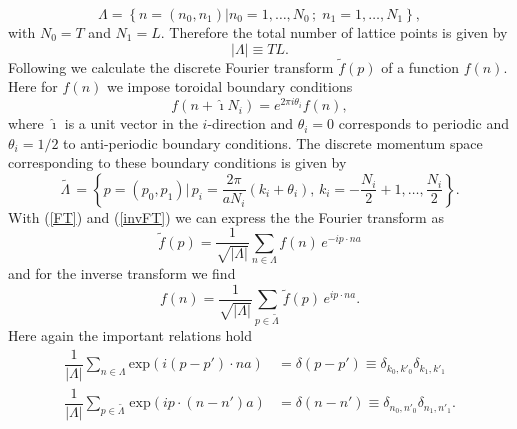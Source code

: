 \begin{equation}
\mathit{\Lambda}=\left\lbrace  n=\left(n_{0},n_{1}\right) \vert n_{0}=1,\ldots,N_{0}\,; \; n_{1}=1,\ldots,N_{1} \right\rbrace,
\end{equation}
with $N_{0}=T$ and $N_{1}=L$. Therefore the total number of lattice points is given by
\begin{equation}
\vert \mathit{\Lambda}\vert \equiv TL.
\end{equation}
Following \cite{gattringer2009quantum} we calculate the discrete Fourier transform $\tilde{f}(p)$ of a function $f(n)$. Here for $f(n)$ we impose toroidal boundary conditions
\begin{equation}
f(n+\hat{\imath}N_{i})= e ^{2\pi i \theta_{i}}f(n),
\label{eq: boundary_cond}
\end{equation}
where $\hat{\imath}$ is a unit vector in the $i$-direction and $\theta_{i}=0$ corresponds to periodic and $\theta_{i}=1/2$ to anti-periodic boundary conditions. The discrete momentum space corresponding to these boundary conditions is given by
\begin{equation}
\mathit{\widetilde{\Lambda\,}}= \left\lbrace p=(p_{0},p_{1}) \vert\, p_{i}=\dfrac{2\pi}{aN_{i}}(k_{i}+\theta_{i}) ,\, k_{i}=-\dfrac{N_{i}}{2}+1,\ldots,\dfrac{N_{i}}{2} \right\rbrace.
\end{equation}
With (\ref{FT}) and (\ref{invFT}) we can express the the Fourier transform as
\begin{equation}
\tilde{f}(p)=\dfrac{1}{\sqrt{\vert\mathit{\Lambda}\vert}} \sum\limits_{n\in \mathit{\Lambda}} f(n)\,  e ^{- i  p\cdot na}
\end{equation}
and for the inverse transform we find
\begin{equation}
f(n) = \dfrac{1}{\sqrt{\vert\mathit{\Lambda}\vert}} \sum\limits_{p\in \widetilde{\mathit{\Lambda}\,}} \tilde{f}(p)\,  e ^{ i p\cdot na}.
\end{equation}
Here again the important relations hold
\begin{align}
\dfrac{1}{\vert\mathit{\Lambda}\vert} \sum\limits_{n\in \mathit{\Lambda}} \text{exp}( i (p-p')\cdot na) &=\delta(p-p') \equiv \delta_{k_{0},k'_{0}}\delta_{k_{1},k'_{1}} \\
\dfrac{1}{\vert\mathit{\Lambda}\vert} \sum\limits_{p\in  \widetilde{\mathit{\Lambda}\,}} \text{exp}( i p\cdot (n-n')a) &=\delta(n-n') \equiv \delta_{n_{0},n'_{0}}\delta_{n_{1},n'_{1}}.
\end{align}
%
%
%
%
%
%
%
%
%
%
%
